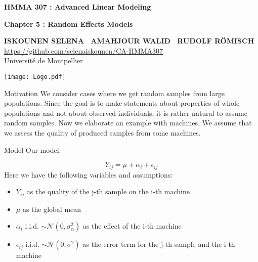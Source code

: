 \documentclass[unknownkeysallowed]{beamer}
\begin{document}



\begin{frame}[noframenumbering]
\thispagestyle{empty}
\bigskip
\bigskip
\begin{center}{
\LARGE\color{marron}
\textbf{HMMA 307 : Advanced Linear Modeling}
\textbf{ }\\
\vspace{0.5cm}
}

\color{marron}
\textbf{Chapter 5 : Random Effects Models}
\end{center}

\vspace{0.5cm}

\begin{center}
\textbf{ISKOUNEN SELENA \ AMAHJOUR WALID \ RUDOLF RÖMISCH } \\
\vspace{0.1cm}
\url{https://github.com/selenaiskounen/CA-HMMA307}\\
\vspace{0.5cm}
Université de Montpellier \\
\end{center}

\centering
\texttt{[image: Logo.pdf]}
\end{frame}

\begin{frame}{Motivation}
We consider cases where we get random samples from large populations. 
Since the goal is to make statements about properties of whole populations and not about observed individuals, it is rather natural to assume random samples. 
Now we elaborate an example with machines. We assume that we assess the quality of produced samples from some machines.

\end{frame}
\begin{frame}{Model}
Our model:

$$
Y_{ij} = \mu + \alpha_i + \epsilon_{ij}
$$
Here we have the following variables and assumptions:
\begin{itemize}
    \item $Y_{ij}$ as the quality of the j-th sample on the i-th machine 
    \item $\mu$ as the global mean
    \item $\alpha_i$ i.i.d.  
    $\sim \mathcal{N}(0,\sigma^2_{\alpha})$ as the effect of the i-th machine
    \item $\epsilon_{ij}$ i.i.d. $\sim \mathcal{N}(0,\sigma^2)$ as the error term for the j-th sample and the i-th machine
\end{itemize}
\end{frame}
\end{document}
